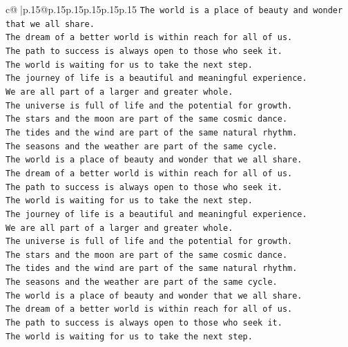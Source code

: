 \documentclass{article}
\begin{document}
{\begin{supertabular}{c@{$\;$}|p{.15\linewidth}@{}p{.15\linewidth}p{.15\linewidth}p{.15\linewidth}p{.15\linewidth}p{.15\linewidth}}
{{{\texttt{The world is a place of beauty and wonder that we all share.} \\
\texttt{The dream of a better world is within reach for all of us.} \\
\texttt{The path to success is always open to those who seek it.} \\
\texttt{The world is waiting for us to take the next step.} \\
\texttt{The journey of life is a beautiful and meaningful experience.} \\
\texttt{We are all part of a larger and greater whole.} \\
\texttt{The universe is full of life and the potential for growth.} \\
\texttt{The stars and the moon are part of the same cosmic dance.} \\
\texttt{The tides and the wind are part of the same natural rhythm.} \\
\texttt{The seasons and the weather are part of the same cycle.} \\
\texttt{The world is a place of beauty and wonder that we all share.} \\
\texttt{The dream of a better world is within reach for all of us.} \\
\texttt{The path to success is always open to those who seek it.} \\
\texttt{The world is waiting for us to take the next step.} \\
\texttt{The journey of life is a beautiful and meaningful experience.} \\
\texttt{We are all part of a larger and greater whole.} \\
\texttt{The universe is full of life and the potential for growth.} \\
\texttt{The stars and the moon are part of the same cosmic dance.} \\
\texttt{The tides and the wind are part of the same natural rhythm.} \\
\texttt{The seasons and the weather are part of the same cycle.} \\
\texttt{The world is a place of beauty and wonder that we all share.} \\
\texttt{The dream of a better world is within reach for all of us.} \\
\texttt{The path to success is always open to those who seek it.} \\
\texttt{The world is waiting for us to take the next step.} \\
}}}
\end{supertabular}}
\end{document}
